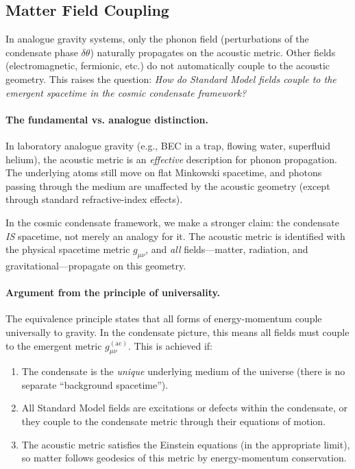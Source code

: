 \subsection{Matter Field Coupling}
\label{sec:matter_coupling}

In analogue gravity systems, only the phonon field (perturbations of the condensate phase $\delta\theta$) naturally propagates on the acoustic metric. Other fields (electromagnetic, fermionic, etc.) do not automatically couple to the acoustic geometry. This raises the question: \emph{How do Standard Model fields couple to the emergent spacetime in the cosmic condensate framework?}

\paragraph{The fundamental vs. analogue distinction.}
In laboratory analogue gravity (e.g., BEC in a trap, flowing water, superfluid helium), the acoustic metric is an \emph{effective} description for phonon propagation. The underlying atoms still move on flat Minkowski spacetime, and photons passing through the medium are unaffected by the acoustic geometry (except through standard refractive-index effects).

In the cosmic condensate framework, we make a stronger claim: the condensate \emph{IS} spacetime, not merely an analogy for it. The acoustic metric is identified with the physical spacetime metric $g_{\mu\nu}$, and \emph{all} fields---matter, radiation, and gravitational---propagate on this geometry.

\paragraph{Argument from the principle of universality.}
The equivalence principle states that all forms of energy-momentum couple universally to gravity. In the condensate picture, this means all fields must couple to the emergent metric $g_{\mu\nu}^{\mathrm{(ac)}}$. This is achieved if:
\begin{enumerate}[leftmargin=2.2em]
    \item The condensate is the \emph{unique} underlying medium of the universe (there is no separate ``background spacetime'').

    \item All Standard Model fields are excitations or defects within the condensate, or they couple to the condensate metric through their equations of motion.

    \item The acoustic metric satisfies the Einstein equations (in the appropriate limit), so matter follows geodesics of this metric by energy-momentum conservation.
\end{enumerate}

